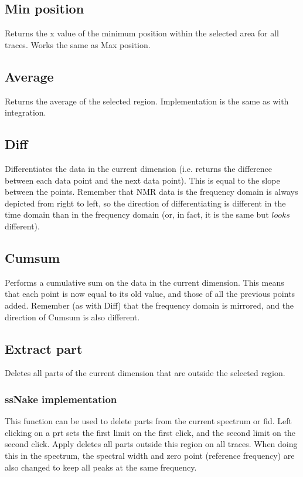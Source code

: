 \documentclass[11pt,a4paper]{article}
\begin{document}
\subsection{Min position}
Returns the x value of the minimum position within the selected area for all traces. Works the same as Max position.

\subsection{Average}
Returns the average of the selected region. Implementation is the same as with integration.

\subsection{Diff}
Differentiates the data in the current dimension (i.e. returns the difference between each data point and the next data point). This is equal to the slope between the points. Remember that NMR data is the frequency domain is always depicted from right to left, so the direction of differentiating is different in the time domain than in the frequency domain (or, in fact, it is the same but $looks$ different).

\subsection{Cumsum}
Performs a cumulative sum on the data in the current dimension. This means that each point is now equal to its old value, and those of all the previous points added. Remember (as with Diff) that the frequency domain is mirrored, and the direction of Cumsum is also different.


\subsection{Extract part}
Deletes all parts of the current dimension that are outside the selected region.

\subsubsection*{ssNake implementation}
This function can be used to delete parts from the current spectrum or fid. Left clicking on a prt sets the first limit on the first click, and the second limit on the second click. Apply deletes all parts outside this region on all traces. When doing this in the spectrum, the spectral width and zero point (reference frequency) are also changed to keep all peaks at the same frequency.
\end{document}
